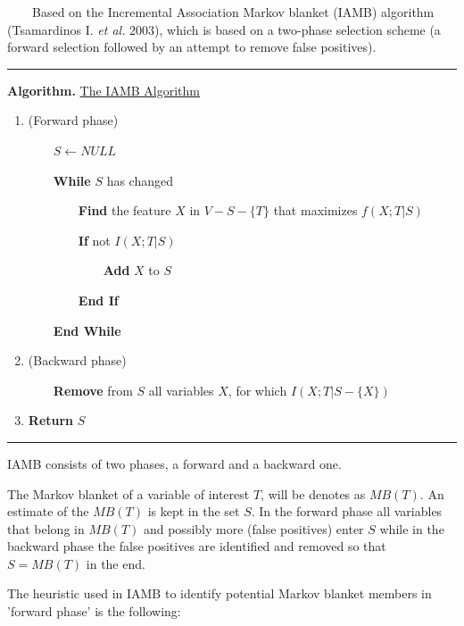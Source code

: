 ~~~~Based on the Incremental Association Markov blanket (IAMB) algorithm (Tsamardinos I. \emph{et al.} 2003), which is based on a two-phase selection scheme (a forward selection followed by an attempt to remove false positives).

\begin{center}\rule[0.5ex]{0.9\columnwidth}{1pt}\end{center}

\textbf{Algorithm.} \underline{The IAMB Algorithm}

\begin{enumerate}
	\item (Forward phase)
	
	~~~~$S \leftarrow NULL$
	
	~~~~\textbf{While} $S$ has changed
	
	~~~~~~~~\textbf{Find} the feature $X$ in $V-S-\{T\}$ that maximizes $f(X ; T|S)$
	
	~~~~~~~~\textbf{If} not $I(X ; T|S)$
	
	~~~~~~~~~~~~\textbf{Add} $X$ to $S$
	
	~~~~~~~~\textbf{End If}
	
	~~~~\textbf{End While}
	
	\item (Backward phase)

	~~~~\textbf{Remove} from $S$ all variables $X$, for which $I(X ; T|S-\{X\})$
	
	\item \textbf{Return} $S$
\end{enumerate}

\begin{center}\rule[0.5ex]{0.9\columnwidth}{1pt}\end{center}

IAMB consists of two phases, a forward and a backward one.

The Markov blanket of a variable of interest $T$, will be denotes as $MB(T)$. An estimate of the $MB(T)$ is kept in the set $S$. In the forward phase all variables that belong in $MB(T)$ and possibly more (false positives) enter $S$ while in the backward phase the false positives are identified and removed so that $S = MB(T)$ in the end.

The heuristic used in IAMB to identify potential Markov blanket members in 'forward phase' is the following:


